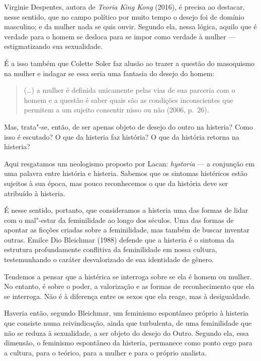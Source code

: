 Virginie Despentes, autora de \emph{Teoria King Kong} (2016), é
precisa ao destacar, nesse sentido, que no campo político por muito
tempo o desejo foi de domínio masculino; e da mulher nada se quis ouvir.
Segundo ela, nessa lógica, aquilo que é verdade para o homem se desloca
para se impor como verdade à mulher --- estigmatizando sua sexualidade.

É a isso também que Colette Soler faz alusão ao trazer a questão do
masoquismo na mulher e indagar se essa seria uma fantasia do desejo do
homem:

\begin{quote}
(\ldots{}) a mulher é definida unicamente pelas vias de sua parceria com o
homem e a questão é saber quais são as condições inconscientes que
permitem a um sujeito consentir nisso ou não (2006, p.~26).
\end{quote}

Mas, trata"-se, então, de ser apenas objeto de desejo do outro na
histeria? Como isso é escutado? O que da histeria faz história? O que da
história retorna na histeria?

Aqui resgatamos um neologismo proposto por Lacan: \emph{hystoria} --- a
conjunção em uma palavra entre história e histeria. Sabemos que os
sintomas histéricos estão sujeitos à sua época, mas pouco reconhecemos o
que da história deve ser atribuído à histeria.

É nesse sentido, portanto, que consideramos a histeria uma das formas de
lidar com o mal"-estar da feminilidade ao longo dos séculos. Uma das
formas de apontar as ficções criadas sobre a feminilidade, mas também de
buscar inventar outras. Emilce Dio Bleichmar (1988) defende que a
histeria é o sintoma da estrutura profundamente conflitiva da
feminilidade em nossa cultura, testemunhando o caráter desvalorizado de
sua identidade de gênero.

Tendemos a pensar que a histérica se interroga sobre se ela é homem ou
mulher. No entanto, é sobre o poder, a valorização e as formas de
reconhecimento que ela se interroga. Não é à diferença entre os sexos
que ela reage, mas à desigualdade.

Haveria então, segundo Bleichmar, um feminismo espontâneo próprio à
histeria que consiste numa reivindicação, ainda que turbulenta, de uma
feminilidade que não se reduza à sexualidade, a ser objeto do desejo do
Outro. Segundo ela, essa dimensão, o feminismo espontâneo da histeria,
permanece como ponto cego para a cultura, para o teórico, para a mulher
e para o próprio analista.


